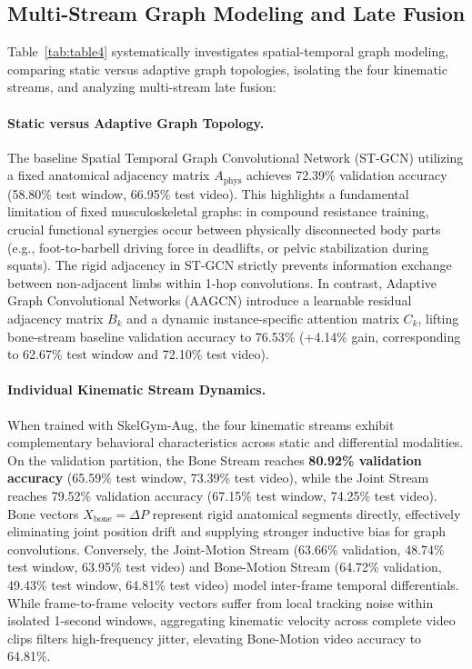 \documentclass[runningheads]{llncs}
\begin{document}
\subsection{Multi-Stream Graph Modeling and Late Fusion}
Table~\ref{tab:table4} systematically investigates spatial-temporal graph modeling, comparing static versus adaptive graph topologies, isolating the four kinematic streams, and analyzing multi-stream late fusion:

\paragraph{Static versus Adaptive Graph Topology.} The baseline Spatial Temporal Graph Convolutional Network (ST-GCN) utilizing a fixed anatomical adjacency matrix $A_{\text{phys}}$ achieves 72.39\% validation accuracy (58.80\% test window, 66.95\% test video). This highlights a fundamental limitation of fixed musculoskeletal graphs: in compound resistance training, crucial functional synergies occur between physically disconnected body parts (e.g., foot-to-barbell driving force in deadlifts, or pelvic stabilization during squats). The rigid adjacency in ST-GCN strictly prevents information exchange between non-adjacent limbs within 1-hop convolutions. In contrast, Adaptive Graph Convolutional Networks (AAGCN) introduce a learnable residual adjacency matrix $B_k$ and a dynamic instance-specific attention matrix $C_k$, lifting bone-stream baseline validation accuracy to 76.53\% (+4.14\% gain, corresponding to 62.67\% test window and 72.10\% test video).

\paragraph{Individual Kinematic Stream Dynamics.} When trained with SkelGym-Aug, the four kinematic streams exhibit complementary behavioral characteristics across static and differential modalities. On the validation partition, the Bone Stream reaches \textbf{80.92\% validation accuracy} (65.59\% test window, 73.39\% test video), while the Joint Stream reaches 79.52\% validation accuracy (67.15\% test window, 74.25\% test video). Bone vectors $X_{\text{bone}} = \Delta P$ represent rigid anatomical segments directly, effectively eliminating joint position drift and supplying stronger inductive bias for graph convolutions. Conversely, the Joint-Motion Stream (63.66\% validation, 48.74\% test window, 63.95\% test video) and Bone-Motion Stream (64.72\% validation, 49.43\% test window, 64.81\% test video) model inter-frame temporal differentials. While frame-to-frame velocity vectors suffer from local tracking noise within isolated 1-second windows, aggregating kinematic velocity across complete video clips filters high-frequency jitter, elevating Bone-Motion video accuracy to 64.81\%.
\end{document}
